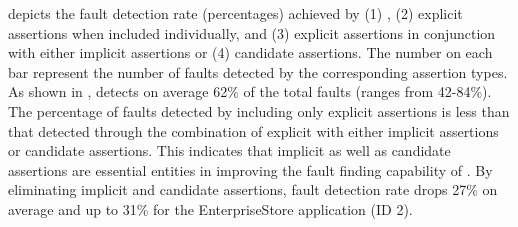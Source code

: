   depicts the fault detection rate (percentages) achieved by (1) \tool, (2) explicit assertions when included individually, and (3) explicit assertions in conjunction with either implicit assertions or (4) candidate assertions. The number on each bar represent the number of faults detected by the corresponding assertion types. As shown in , \tool detects on average 62\% of the total faults (ranges from 42-84\%).
The percentage of faults detected by including only explicit assertions is less than that detected  through the combination of explicit with either implicit assertions or candidate assertions. This indicates that implicit as well as candidate assertions are essential entities in improving the fault finding capability of \tool. By eliminating implicit and candidate assertions, fault detection rate drops 27\% on average and up to 31\% for the EnterpriseStore application (ID 2).

